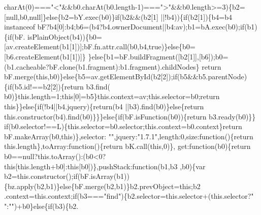 \begin{DoxyCode}
      charAt(0)===\textcolor{stringliteral}{"<"}&&b0.charAt(b0.length-1)===\textcolor{stringliteral}{">"}&&b0.length>=3)\{b2=[null,b0,null]\}\textcolor{keywordflow}{else}\{b2=bY.exec(b0)\}\textcolor{keywordflow}{if}(b2&&(b2[1]
      ||!b4))\{\textcolor{keywordflow}{if}(b2[1])\{b4=b4 instanceof bF?b4[0]:b4;b6=(b4?b4.ownerDocument||b4:av);b1=bA.exec(b0);\textcolor{keywordflow}{if}(b1)\{\textcolor{keywordflow}{if}(bF.
      isPlainObject(b4))\{b0=[av.createElement(b1[1])];bF.fn.attr.call(b0,b4,\textcolor{keyword}{true})\}\textcolor{keywordflow}{else}\{b0=[b6.createElement(b1[1])]\}
      \}\textcolor{keywordflow}{else}\{b1=bF.buildFragment([b2[1]],[b6]);b0=(b1.cacheable?bF.clone(b1.fragment):b1.fragment).childNodes\}\textcolor{keywordflow}{
      return} bF.merge(\textcolor{keyword}{this},b0)\}\textcolor{keywordflow}{else}\{b5=av.getElementById(b2[2]);\textcolor{keywordflow}{if}(b5&&b5.parentNode)\{\textcolor{keywordflow}{if}(b5.id!==b2[2])\{\textcolor{keywordflow}{return} b3.find(
      b0)\}this.length=1;\textcolor{keyword}{this}[0]=b5\}this.context=av;this.selector=b0;\textcolor{keywordflow}{return} \textcolor{keyword}{this}\}\}\textcolor{keywordflow}{else}\{\textcolor{keywordflow}{if}(!b4||b4.jquery)\{\textcolor{keywordflow}{return}(b4
      ||b3).find(b0)\}\textcolor{keywordflow}{else}\{\textcolor{keywordflow}{return} this.constructor(b4).find(b0)\}\}\}\textcolor{keywordflow}{else}\{\textcolor{keywordflow}{if}(bF.isFunction(b0))\{\textcolor{keywordflow}{return} b3.ready(b0)\}\}\textcolor{keywordflow}{
      if}(b0.selector!==L)\{this.selector=b0.selector;this.context=b0.context\}\textcolor{keywordflow}{return} bF.makeArray(b0,\textcolor{keyword}{this})\},selector:\textcolor{stringliteral}{
      ""},jquery:\textcolor{stringliteral}{"1.7.1"},length:0,size:\textcolor{keyword}{function}()\{\textcolor{keywordflow}{return} this.length\},toArray:\textcolor{keyword}{function}()\{\textcolor{keywordflow}{return} bK.call(\textcolor{keyword}{this},0)\},\textcolor{keyword}{
      get}:\textcolor{keyword}{function}(b0)\{\textcolor{keywordflow}{return} b0==null?this.toArray():(b0<0?this[this.length+b0]:this[b0])\},pushStack:function(b1,b3
      ,b0)\{var b2=this.constructor();\textcolor{keywordflow}{if}(bF.isArray(b1))\{bz.apply(b2,b1)\}\textcolor{keywordflow}{else}\{bF.merge(b2,b1)\}b2.prevObject=\textcolor{keyword}{this};b2
      .context=this.context;\textcolor{keywordflow}{if}(b3===\textcolor{stringliteral}{"find"})\{b2.selector=this.selector+(this.selector?\textcolor{stringliteral}{" "}:\textcolor{stringliteral}{""})+b0\}\textcolor{keywordflow}{else}\{\textcolor{keywordflow}{if}(b3)\{b2.

\end{DoxyCode}
